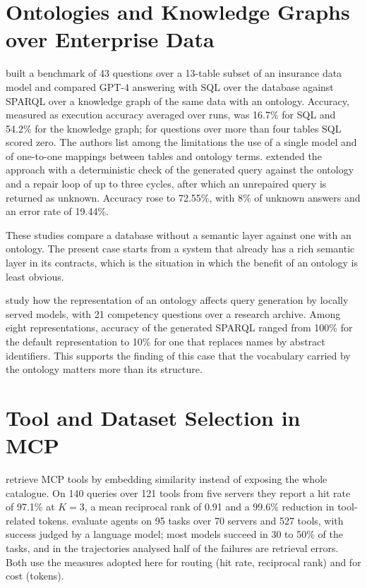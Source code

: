 \section{Ontologies and Knowledge Graphs over Enterprise Data}
 built a benchmark of 43 questions over a 13-table subset
of an insurance data model and compared GPT-4 answering with SQL over the database against
SPARQL over a knowledge graph of the same data with an ontology. Accuracy, measured as
execution accuracy averaged over runs, was 16.7\% for SQL and 54.2\% for the knowledge
graph; for questions over more than four tables SQL scored zero. The authors list among
the limitations the use of a single model and of one-to-one mappings between tables and
ontology terms.  extended the approach with a
deterministic check of the generated query against the ontology and a repair loop of up to
three cycles, after which an unrepaired query is returned as unknown. Accuracy rose to
72.55\%, with 8\% of unknown answers and an error rate of 19.44\%.

These studies compare a database without a semantic layer against one with an ontology. The
present case starts from a system that already has a rich semantic layer in its contracts,
which is the situation in which the benefit of an ontology is least obvious.

 study how the representation of an ontology affects query
generation by locally served models, with 21 competency questions over a research archive.
Among eight representations, accuracy of the generated SPARQL ranged from 100\% for the
default representation to 10\% for one that replaces names by abstract identifiers. This
supports the finding of this case that the vocabulary carried by the ontology matters more
than its structure.

\section{Tool and Dataset Selection in MCP}
 retrieve MCP tools by embedding similarity instead of
exposing the whole catalogue. On 140 queries over 121 tools from five servers they report a
hit rate of 97.1\% at $K=3$, a mean reciprocal rank of 0.91 and a 99.6\% reduction in
tool-related tokens.  evaluate agents on 95 tasks over 70
servers and 527 tools, with success judged by a language model; most models succeed in 30
to 50\% of the tasks, and in the trajectories analysed half of the failures are retrieval
errors. Both use the measures adopted here for routing (hit rate, reciprocal rank) and for
cost (tokens).

